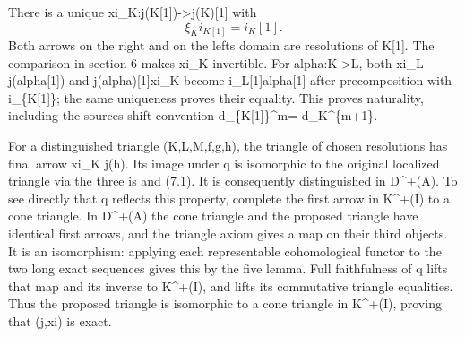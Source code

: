 \documentclass[11pt]{article}
\begin{document}
There is a unique xi\_\allowbreak{}K:\allowbreak{}j(K[1]\allowbreak{})\allowbreak{}\allowbreak{}->j(K)\allowbreak{}[1]\allowbreak{} with \[
 \xi_K i_{K[1]}=i_K[1].
                                                               \tag{7.1}
\] Both arrows on the right and on the left\textquotesingle s domain are resolutions of K[1]\allowbreak{}. The comparison in section 6 makes xi\_\allowbreak{}K invertible. For alpha:\allowbreak{}K\allowbreak{}->L,\allowbreak{} both xi\_\allowbreak{}L j(alpha[1]\allowbreak{})\allowbreak{} and j(alpha)\allowbreak{}[1]\allowbreak{}xi\_\allowbreak{}K become i\_\allowbreak{}L[1]\allowbreak{}alpha[1]\allowbreak{} after precomposition with i\_\allowbreak{}\{K[1]\allowbreak{}\}; the same uniqueness proves their equality. This proves naturality,\allowbreak{} including the source\textquotesingle s shift convention d\_\allowbreak{}\{K[1]\allowbreak{}\}\textasciicircum{}m\allowbreak{}=-d\_\allowbreak{}K\textasciicircum{}\{m\allowbreak{}+1\}.

For a distinguished triangle (K,\allowbreak{}L,\allowbreak{}M,\allowbreak{}f,\allowbreak{}g,\allowbreak{}h)\allowbreak{},\allowbreak{} the triangle of chosen resolutions has final arrow xi\_\allowbreak{}K j(h)\allowbreak{}. Its image under q is isomorphic to the original localized triangle via the three i\textquotesingle s and (7.1)\allowbreak{}. It is consequently distinguished in D\textasciicircum{}\allowbreak{}+(A)\allowbreak{}. To see directly that q reflects this property,\allowbreak{} complete the first arrow in K\textasciicircum{}\allowbreak{}+(I)\allowbreak{} to a cone triangle. In D\textasciicircum{}\allowbreak{}+(A)\allowbreak{} the cone triangle and the proposed triangle have identical first arrows,\allowbreak{} and the triangle axiom gives a map on their third objects. It is an isomorphism:\allowbreak{} applying each representable cohomological functor to the two long exact sequences gives this by the five lemma. Full faithfulness of q lifts that map and its inverse to K\textasciicircum{}\allowbreak{}+(I)\allowbreak{},\allowbreak{} and lifts its commutative triangle equalities. Thus the proposed triangle is isomorphic to a cone triangle in K\textasciicircum{}\allowbreak{}+(I)\allowbreak{},\allowbreak{} proving that (j,\allowbreak{}xi)\allowbreak{} is exact.
\end{document}
